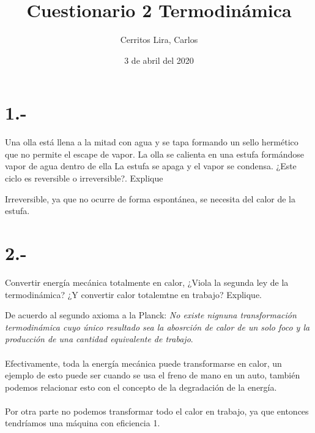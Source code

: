 \documentclass{article}
\title{Cuestionario 2 Termodinámica}
\author{Cerritos Lira, Carlos}
\date{3 de abril del 2020}
\begin{document}
\maketitle
\section*{1.-}
Una olla está llena a la mitad con agua y se tapa formando un sello
hermético que no permite el escape de vapor. La olla se calienta en una estufa 
formándose vapor de agua dentro de ella La estufa se apaga y el vapor se condensa. 
¿Este ciclo es reversible o irreversible?. Explique
\begin{tcolorbox}[breakable]
    Irreversible, ya que no ocurre de forma espontánea, se necesita del calor de la estufa.
\end{tcolorbox}

\section*{2.-}
Convertir energía mecánica totalmente en calor, ¿Viola la segunda ley de la termodinámica?
¿Y convertir calor totalemtne en trabajo? Explique.
\begin{tcolorbox}[breakable]
    De acuerdo al segundo axioma a la Planck: \textit{No existe nignuna transformación termodinámica
    cuyo único resultado sea la abosrción de calor de un solo foco y la producción de una cantidad
    equivalente de trabajo}. \\ \\
    Efectivamente, toda la energía mecánica puede transformarse en calor, un ejemplo de esto puede ser cuando se 
    usa el freno de mano en un auto, también podemos relacionar esto con el concepto de la degradación de la energía. \\ \\
    Por otra parte no podemos transformar todo el calor en trabajo, ya que entonces tendríamos una 
    máquina con eficiencia 1.  
\end{tcolorbox}
\end{document}
